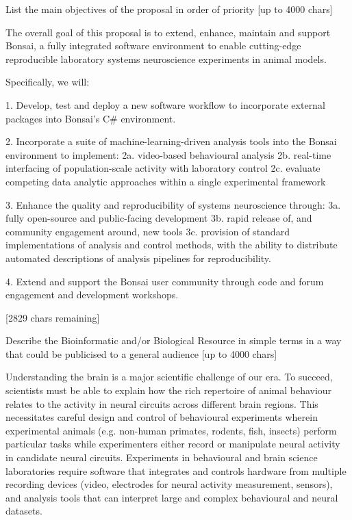 
List the main objectives of the proposal in order of priority [up to
  4000 chars]

The overall goal of this proposal is to extend, enhance, maintain and support Bonsai, a fully integrated software
environment to enable cutting-edge reproducible laboratory systems neuroscience experiments in animal models.

Specifically, we will:

1. Develop, test and deploy a new software workflow to incorporate external packages into Bonsai's C# environment.

2. Incorporate a suite of machine-learning-driven analysis tools into the Bonsai environment to implement:
2a. video-based  behavioural analysis
2b. real-time interfacing of population-scale activity with laboratory control  
2c. evaluate competing data analytic approaches within a single experimental framework

3. Enhance the quality and reproducibility of systems neuroscience through:
3a. fully open-source and public-facing development
3b. rapid release of, and community engagement around, new tools
3c. provision of standard implementations of analysis and control methods, with the ability to distribute automated
descriptions of analysis pipelines for reproducibility.

4. Extend and support the Bonsai user community through code and forum engagement and development workshops.

[2829 chars remaining]




Describe the Bioinformatic and/or Biological Resource in simple terms in a way that could be publicised to a general audience [up to 4000 chars]

Understanding the brain is a major scientific challenge of our era. To succeed, scientists must be able to explain how the rich repertoire of animal behaviour relates to the activity in neural circuits across different brain regions. This necessitates careful design and control of behavioural experiments wherein experimental animals (e.g. non-human primates, rodents, fish, insects) perform particular tasks while experimenters either record or manipulate neural activity in candidate neural circuits. 
Experiments in behavioural and brain science laboratories require software that integrates and controls hardware from multiple recording devices (video, electrodes for neural activity measurement, sensors), and analysis tools that can interpret large and complex behavioural and neural datasets. 

